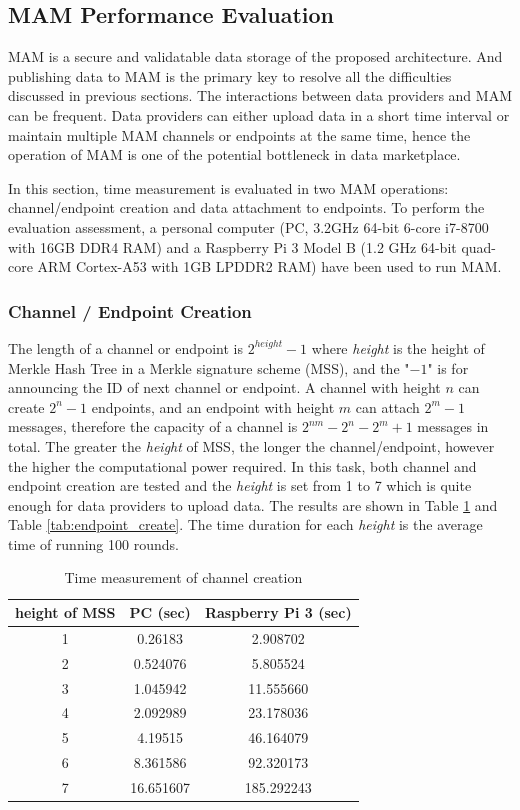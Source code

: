 \documentclass[conference]{IEEEtran}
\begin{document}
\subsection{MAM Performance Evaluation}
MAM is a secure and validatable data storage of the proposed architecture. And publishing data to MAM is the primary key to resolve all the difficulties discussed in previous sections. The interactions between data providers and MAM can be frequent. Data providers can either upload data in a short time interval or maintain multiple MAM channels or endpoints at the same time, hence the operation of MAM is one of the potential bottleneck in data marketplace.

In this section, time measurement is evaluated in two MAM operations: channel/endpoint creation and data attachment to endpoints. To perform the evaluation assessment, a personal computer (PC, 3.2GHz 64-bit 6-core i7-8700 with 16GB DDR4 RAM) and a Raspberry Pi 3 Model B (1.2 GHz 64-bit quad-core ARM Cortex-A53 with 1GB LPDDR2 RAM) have been used to run MAM. 

\subsubsection{Channel / Endpoint Creation}
The length of a channel or endpoint is $2^{height}-1$ where \textit{height} is the height of Merkle Hash Tree in a Merkle signature scheme (MSS), and the "$-1$" is for announcing the ID of next channel or endpoint. A channel with height $n$ can create $2^n-1$ endpoints, and an endpoint with height $m$ can attach $2^m-1$ messages, therefore the capacity of a channel is $2^{nm}-2^n-2^m+1$ messages in total. The greater the \textit{height} of MSS, the longer the channel/endpoint, however the higher the computational power required. In this task, both channel and endpoint creation are tested and the \textit{height} is set from 1 to 7 which is quite enough for data providers to upload data. The results are shown in Table \ref{tab:channel_create} and Table \ref{tab:endpoint_create}. The time duration for each \textit{height} is the average time of running 100 rounds.

\begin{table}[htbp]
	\caption{Time measurement of channel creation}
	\label{tab:channel_create}
	\begin{center}
	\begin{tabular}{|c|c|c|}
	\hline
		\textbf{height of MSS} & \textbf{PC (sec)} & \textbf{Raspberry Pi 3 (sec)} \\ 
		\hline
		1 & 0.26183 & 2.908702 \\ 
		2 & 0.524076 & 5.805524 \\ 
		3 & 1.045942 & 11.555660 \\ 
		4 & 2.092989 & 23.178036 \\ 
		5 & 4.19515 & 46.164079\\ 
		6 & 8.361586 & 92.320173\\ 
		7 & 16.651607 & 185.292243\\
		\hline
	\end{tabular}
	\end{center}
\end{table}
\end{document}
